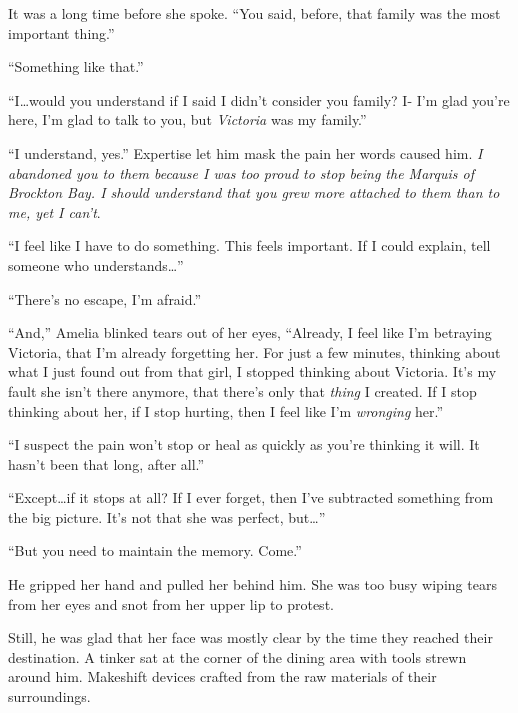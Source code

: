 It was a long time before she spoke.  ``You said, before, that family was the most important thing.''



``Something like that.''



``I\ldots would you understand if I said I didn't consider you family?  I- I'm glad you're here, I'm glad to talk to you, but \emph{Victoria} was my family.''



``I understand, yes.''  Expertise let him mask the pain her words caused him.  \emph{I abandoned you to them because I was too proud to stop being the Marquis of Brockton Bay.  I should understand that you grew more attached to them than to me, yet I can't}.



``I feel like I have to do something.  This feels important.  If I could explain, tell someone who understands\ldots''



``There's no escape, I'm afraid.''



``And,'' Amelia blinked tears out of her eyes, ``Already, I feel like I'm betraying Victoria, that I'm already forgetting her.  For just a few minutes, thinking about what I just found out from that girl, I stopped thinking about Victoria.  It's my fault she isn't there anymore, that there's only that \emph{thing }I created.  If I stop thinking about her, if I stop hurting, then I feel like I'm \emph{wronging} her.''



``I suspect the pain won't stop or heal as quickly as you're thinking it will.  It hasn't been that long, after all.''



``Except\ldots if it stops at all?  If I ever forget, then I've subtracted something from the big picture.  It's not that she was perfect, but\ldots''



``But you need to maintain the memory.  Come.''



He gripped her hand and pulled her behind him.  She was too busy wiping tears from her eyes and snot from her upper lip to protest.



Still, he was glad that her face was mostly clear by the time they reached their destination.  A tinker sat at the corner of the dining area with tools strewn around him.  Makeshift devices crafted from the raw materials of their surroundings.



